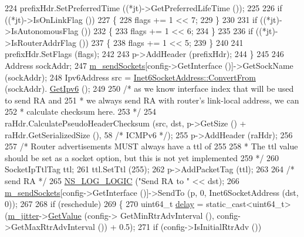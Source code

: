 \begin{DoxyCode}
224       prefixHdr.SetPreferredTime ((*jt)->GetPreferredLifeTime ());
225 
226       \textcolor{keywordflow}{if} ((*jt)->IsOnLinkFlag ())
227         \{
228           flags += 1 << 7;
229         \}
230 
231       \textcolor{keywordflow}{if} ((*jt)->IsAutonomousFlag ())
232         \{
233           flags += 1 << 6;
234         \}
235 
236       \textcolor{keywordflow}{if} ((*jt)->IsRouterAddrFlag ())
237         \{
238           flags += 1 << 5;
239         \}
240 
241       prefixHdr.SetFlags (flags);
242 
243       p->AddHeader (prefixHdr);
244     \}
245 
246   Address sockAddr;
247   \hyperlink{classns3_1_1Radvd_ab0bd7a7d72f1ec0909ec447bcdf4788e}{m\_sendSockets}[config->GetInterface ()]->GetSockName (sockAddr);
248   Ipv6Address src = \hyperlink{classns3_1_1Inet6SocketAddress_a2177c66e1bcf17c85dcffb9d2a971f5a}{Inet6SocketAddress::ConvertFrom} (sockAddr).
      \hyperlink{classns3_1_1Inet6SocketAddress_a19c83458e1e61d5accd19bec5afb254e}{GetIpv6} ();
249 
250   \textcolor{comment}{/* as we know interface index that will be used to send RA and }
251 \textcolor{comment}{   * we always send RA with router's link-local address, we can }
252 \textcolor{comment}{   * calculate checksum here.}
253 \textcolor{comment}{   */}
254   raHdr.CalculatePseudoHeaderChecksum (src, dst, p->GetSize () + raHdr.GetSerializedSize (), 58 \textcolor{comment}{/* ICMPv6 
      */});
255   p->AddHeader (raHdr);
256 
257   \textcolor{comment}{/* Router advertisements MUST always have a ttl of 255}
258 \textcolor{comment}{   * The ttl value should be set as a socket option, but this is not yet implemented}
259 \textcolor{comment}{   */}
260   SocketIpTtlTag ttl;
261   ttl.SetTtl (255);
262   p->AddPacketTag (ttl);
263 
264   \textcolor{comment}{/* send RA */}
265   \hyperlink{group__logging_ga88acd260151caf2db9c0fc84997f45ce}{NS\_LOG\_LOGIC} (\textcolor{stringliteral}{"Send RA to "} << dst);
266   \hyperlink{classns3_1_1Radvd_ab0bd7a7d72f1ec0909ec447bcdf4788e}{m\_sendSockets}[config->GetInterface ()]->SendTo (p, 0, Inet6SocketAddress (dst, 0));
267 
268   \textcolor{keywordflow}{if} (reschedule)
269     \{
270       uint64\_t \hyperlink{lte_2model_2fading-traces_2fading__trace__generator_8m_a7964e6aa8f61a9d28973c8267a606ad8}{delay} = \textcolor{keyword}{static\_cast<}uint64\_t\textcolor{keyword}{>} (\hyperlink{classns3_1_1Radvd_a14f71f3c45656a0280d512cb1b148839}{m\_jitter}->\hyperlink{classns3_1_1UniformRandomVariable_a03822d8c86ac51e9aa83bbc73041386b}{GetValue} (config->
      GetMinRtrAdvInterval (), config->GetMaxRtrAdvInterval ()) + 0.5);
271       \textcolor{keywordflow}{if} (config->IsInitialRtrAdv ())

\end{DoxyCode}
